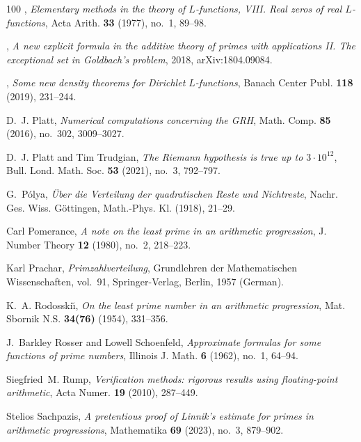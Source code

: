 \documentclass[11pt]{amsart}
\numberwithin{equation}{section}
\theoremstyle{plain}
\theoremstyle{definition}
\theoremstyle{remark}
\newcommand{\1}{\mathbf{1}}
\begin{document}
\begin{thebibliography}{100}
\bysame, \emph{Elementary methods in the theory of {$L$}-functions, {VIII}.
  {R}eal zeros of real {$L$}-functions}, Acta Arith. \textbf{33} (1977), no.~1,
  89--98.

\bysame, \emph{A new explicit formula in the additive theory of primes with
  applications {II}. {T}he exceptional set in {G}oldbach's problem}, 2018,
  arXiv:1804.09084.

\bysame, \emph{Some new density theorems for {D}irichlet {$L$}-functions},
  Banach Center Publ. \textbf{118} (2019), 231--244.

D.~J. Platt, \emph{Numerical computations concerning the {GRH}}, Math. Comp.
  \textbf{85} (2016), no.~302, 3009--3027.

D.~J. Platt and Tim Trudgian, \emph{The {R}iemann hypothesis is true up to
  {$3\cdot 10^{12}$}}, Bull. Lond. Math. Soc. \textbf{53} (2021), no.~3,
  792--797.

G.~P{\'o}lya, \emph{{\"U}ber die {V}erteilung der quadratischen {R}este und
  {N}ichtreste}, Nachr. Ges. Wiss. G{\"o}ttingen, Math.-Phys. Kl. (1918),
  21--29.

Carl Pomerance, \emph{A note on the least prime in an arithmetic progression},
  J. Number Theory \textbf{12} (1980), no.~2, 218--223.

Karl Prachar, \emph{Primzahlverteilung}, Grundlehren der Mathematischen
  Wissenschaften, vol.~91, Springer-Verlag, Berlin, 1957 (German).

K.~A. Rodosski{\u\i}, \emph{On the least prime number in an arithmetic
  progression}, Mat. Sbornik N.S. \textbf{34(76)} (1954), 331--356. 

J.~Barkley Rosser and Lowell Schoenfeld, \emph{Approximate formulas for some
  functions of prime numbers}, Illinois J. Math. \textbf{6} (1962), no.~1,
  64--94.

Siegfried~M. Rump, \emph{Verification methods: rigorous results using
  floating-point arithmetic}, Acta Numer. \textbf{19} (2010), 287--449.

Stelios Sachpazis, \emph{A pretentious proof of {L}innik's estimate for primes
  in arithmetic progressions}, Mathematika \textbf{69} (2023), no.~3, 879--902.


\end{thebibliography}
\end{document}
